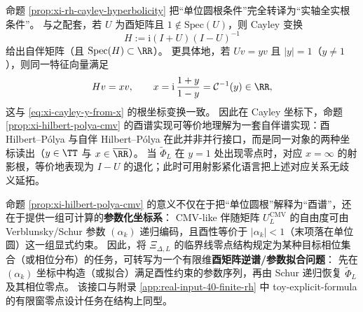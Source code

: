 \begin{remark}\label{rem:xi-cayley-hilbert-polya-unify}
命题 \ref{prop:xi-rh-cayley-hyperbolicity} 把“单位圆根条件”完全转译为“实轴全实根条件”。
与之配套，若 \(U\) 为酉矩阵且 \(1\notin\mathrm{Spec}(U)\)，则 Cayley 变换
\[
\boxed{\ H:=\mathrm{i}(I+U)(I-U)^{-1}\ }
\]
给出自伴矩阵（且 \(\mathrm{Spec}(H)\subset\RR\)）。
更具体地，若 \(Uv=yv\) 且 \(|y|=1\)（\(y\neq 1\)），则同一特征向量满足
\[
Hv=xv,\qquad x=\mathrm{i}\,\frac{1+y}{1-y}=\mathcal{C}^{-1}(y)\in\RR,
\]
这与 \eqref{eq:xi-cayley-y-from-x} 的根坐标变换一致。
因此在 Cayley 坐标下，命题 \ref{prop:xi-hilbert-polya-cmv} 的酉谱实现可等价地理解为一套自伴谱实现：酉 Hilbert--P{\'o}lya 与自伴 Hilbert--P{\'o}lya 在此并非并行接口，而是同一对象的两种坐标读出（\(y\in\TT\) 与 \(x\in\overline{\RR}\)）。
当 \(\widetilde\Phi_L\) 在 \(y=1\) 处出现零点时，对应 \(x=\infty\) 的射影根，等价地表现为 \(I-U\) 的退化；此时可用射影紧化语言把上述对应关系无歧义延拓。
\end{remark}

\begin{remark}\label{rem:xi-cmv-inverse-spectral}
命题 \ref{prop:xi-hilbert-polya-cmv} 的意义不仅在于把“单位圆根”解释为“酉谱”，还在于提供一组可计算的\textbf{参数化坐标系}：
CMV-like 伴随矩阵 \(U_L^{\mathrm{CMV}}\) 的自由度可由 Verblunsky/Schur 参数 \((\alpha_k)\) 递归编码，且酉性等价于 \(|\alpha_k|<1\)（末项落在单位圆）这一组显式约束。
因此，将 \(\Xi_{\Delta,L}\) 的临界线零点结构规定为某种目标相位集合（或相位分布）的任务，可转写为一个有限维\textbf{酉矩阵逆谱/参数拟合问题}：
先在 \((\alpha_k)\) 坐标中构造（或拟合）满足酉性约束的参数序列，再由 Schur 递归恢复 \(\widetilde\Phi_L\) 及其相位零点。
该接口与附录 \ref{app:real-input-40-finite-rh} 中 toy-explicit-formula 的有限窗零点设计任务在结构上同型。
\end{remark}

